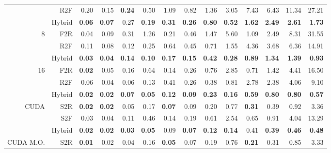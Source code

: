 \documentclass[12pt]{article}
\begin{document}
\begin{table}[ht]
\begin{spacing}{1.2}
{\begin{tabular}{rr|rrrr|rrrr|rrrr}
				& R2F & 0.20 & 0.15 & \textbf{0.24} & 0.50 & 1.09 & 0.82 & 1.36 & 3.05 & 7.43 & 6.43 & 11.34 & 27.21 \\

				& Hybrid & \textbf{0.06} & \textbf{0.07} & 0.27 & \textbf{0.19} & \textbf{0.31} & \textbf{0.26} & \textbf{0.80} & \textbf{0.52} & \textbf{1.62} & \textbf{2.49} & \textbf{2.61} & \textbf{1.73} \\ \hline

				\multirow{3}{*}{8} & F2R & 0.04 & 0.09 & 0.31 & 1.26 & 0.21 & 0.46 & 1.47 & 5.60 & 1.09 & 2.49 & 8.31 & 31.55 \\

				& R2F & 0.11 & 0.08 & 0.12 & 0.25 & 0.64 & 0.45 & 0.71 & 1.55 & 4.36 & 3.68 & 6.36 & 14.91 \\

				& Hybrid & \textbf{0.03} & \textbf{0.04} & \textbf{0.14} & \textbf{0.10} & \textbf{0.17} & \textbf{0.15} & \textbf{0.42} & \textbf{0.28} & \textbf{0.89} & \textbf{1.34} & \textbf{1.39} & \textbf{0.93} \\ \hline

				\multirow{3}{*}{16} & F2R & \textbf{0.02} & 0.05 & 0.16 & 0.64 & 0.14 & 0.26 & 0.76 & 2.85 & 0.71 & 1.42 & 4.41 & 16.50 \\

				& R2F & 0.06 & 0.04 & 0.06 & 0.13 & 0.41 & 0.26 & 0.38 & 0.81 & 2.78 & 2.38 & 4.06 & 9.10 \\

				& Hybrid & \textbf{0.02} & \textbf{0.02} & \textbf{0.07} & \textbf{0.05} & \textbf{0.12} & \textbf{0.09} & \textbf{0.23} & \textbf{0.16} & \textbf{0.59} & \textbf{0.80} & \textbf{0.80} & \textbf{0.57} \\ \hline

				\multirow{3}{*}{CUDA} & S2R & \textbf{0.02} & \textbf{0.02} & 0.05 & 0.17 & \textbf{0.07} & 0.09 & 0.20 & 0.77 & \textbf{0.31} & 0.39 & 0.92 & 3.36 \\

				& S2F & 0.03 & 0.04 & 0.11 & 0.46 & 0.14 & 0.19 & 0.61 & 2.54 & 0.65 & 0.91 & 4.04 & 13.29 \\

				& Hybrid & \textbf{0.02} & \textbf{0.02} & \textbf{0.03} & \textbf{0.05} & 0.09 & \textbf{0.07} & \textbf{0.12} & \textbf{0.14} & 0.41 & \textbf{0.39} & \textbf{0.46} & \textbf{0.48} \\ \hline

				\multirow{3}{*}{CUDA M.O.} & S2R & \textbf{0.01} & 0.02 & 0.04 & 0.16 & \textbf{0.05} & 0.07 & 0.19 & 0.76 & \textbf{0.21} & 0.31 & 0.85 & 3.33 \\
		

\end{tabular}}
\end{spacing}
\end{table}
\end{document}
